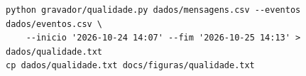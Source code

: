 \begin{lstlisting}[style=terminal, numbers=none]
python gravador/qualidade.py dados/mensagens.csv --eventos dados/eventos.csv \
    --inicio '2026-10-24 14:07' --fim '2026-10-25 14:13' > dados/qualidade.txt
cp dados/qualidade.txt docs/figuras/qualidade.txt
\end{lstlisting}

%
  {\def\arquivoQualidade{figuras/qualidade.txt}}%
  {\def\arquivoQualidade{figuras/qualidade-pendente.txt}}

